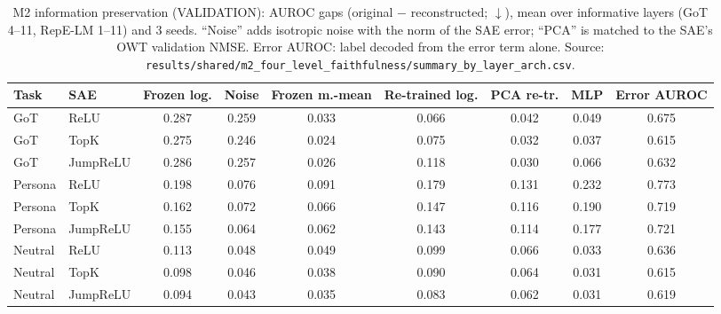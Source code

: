 \begin{table}[t]
\centering
\small
\caption{M2 information preservation (VALIDATION): AUROC gaps (original $-$ reconstructed; $\downarrow$), mean over informative layers (GoT 4--11, RepE-LM 1--11) and 3 seeds. ``Noise'' adds isotropic noise with the norm of the SAE error; ``PCA'' is matched to the SAE's OWT validation NMSE. Error AUROC: label decoded from the error term alone. Source: \texttt{results/\allowbreak{}shared/\allowbreak{}m2\_four\_level\_faithfulness/\allowbreak{}summary\_by\_layer\_arch.csv}.}
\label{tab:m2}
\begin{adjustbox}{max width=\linewidth}
\begin{tabular}{llccccccc}
\toprule
Task & SAE & Frozen log. & Noise & Frozen m.-mean & Re-trained log. & PCA re-tr. & MLP & Error AUROC \\
\midrule
GoT & ReLU & 0.287 & 0.259 & 0.033 & 0.066 & 0.042 & 0.049 & 0.675 \\
GoT & TopK & 0.275 & 0.246 & 0.024 & 0.075 & 0.032 & 0.037 & 0.615 \\
GoT & JumpReLU & 0.286 & 0.257 & 0.026 & 0.118 & 0.030 & 0.066 & 0.632 \\
\midrule
Persona & ReLU & 0.198 & 0.076 & 0.091 & 0.179 & 0.131 & 0.232 & 0.773 \\
Persona & TopK & 0.162 & 0.072 & 0.066 & 0.147 & 0.116 & 0.190 & 0.719 \\
Persona & JumpReLU & 0.155 & 0.064 & 0.062 & 0.143 & 0.114 & 0.177 & 0.721 \\
\midrule
Neutral & ReLU & 0.113 & 0.048 & 0.049 & 0.099 & 0.066 & 0.033 & 0.636 \\
Neutral & TopK & 0.098 & 0.046 & 0.038 & 0.090 & 0.064 & 0.031 & 0.615 \\
Neutral & JumpReLU & 0.094 & 0.043 & 0.035 & 0.083 & 0.062 & 0.031 & 0.619 \\
\bottomrule
\end{tabular}
\end{adjustbox}
\end{table}
